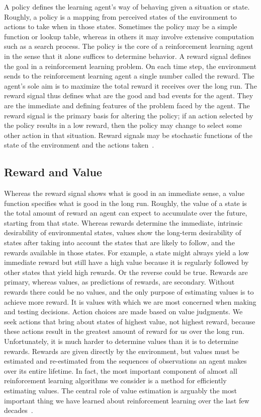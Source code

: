 \documentclass[letterpaper, 10 pt]{IEEEconf}
\begin{document}
A policy defines the learning agent’s way of behaving given a
situation or state. Roughly, a policy is a mapping from perceived
states of the environment to actions to take when in those
states. Sometimes the policy may be a simple function or lookup table,
whereas in others it may involve extensive computation such as a
search process. The policy is the core of a reinforcement learning
agent in the sense that it alone suffices to determine behavior.  A
reward signal defines the goal in a reinforcement learning problem. On
each time step, the environment sends to the reinforcement learning
agent a single number called the reward. The agent’s sole aim is to
maximize the total reward it receives over the long run. The reward
signal thus defines what are the good and bad events for the
agent. They are the immediate and defining features of the problem
faced by the agent. The reward signal is the primary basis for
altering the policy; if an action selected by the policy results in a
low reward, then the policy may change to select some other action in
that situation. Reward signals may be stochastic functions of the
state of the environment and the actions taken~\cite{sutton2018reinforcement}.

\subsection{Reward and Value}

Whereas the reward signal shows what is good in an immediate sense, a
value function specifies what is good in the long run. Roughly, the
value of a state is the total amount of reward an agent can expect to
accumulate over the future, starting from that state. Whereas rewards
determine the immediate, intrinsic desirability of environmental
states, values show the long-term desirability of states after taking
into account the states that are likely to follow, and the rewards
available in those states. For example, a state might always yield a
low immediate reward but still have a high value because it is
regularly followed by other states that yield high rewards. Or the
reverse could be true.  Rewards are primary, whereas values, as
predictions of rewards, are secondary. Without rewards there could be
no values, and the only purpose of estimating values is to achieve
more reward. It is values with which we are most concerned when making
and testing decisions. Action choices are made based on value
judgments. We seek actions that bring about states of highest value,
not highest reward, because these actions result in the greatest
amount of reward for us over the long run. Unfortunately, it is much
harder to determine values than it is to determine rewards. Rewards
are given directly by the environment, but values must be estimated
and re-estimated from the sequences of observations an agent makes
over its entire lifetime. In fact, the most important component of
almost all reinforcement learning algorithms we consider is a method
for efficiently estimating values. The central role of value
estimation is arguably the most important thing we have learned about
reinforcement learning over the last few decades~\cite{sutton2018reinforcement}.
\end{document}
